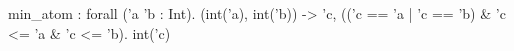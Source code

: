 min_atom : forall ('a 'b : Int). (int('a), int('b)) -> {'c, (('c == 'a | 'c == 'b) & 'c <= 'a & 'c <= 'b). int('c)}